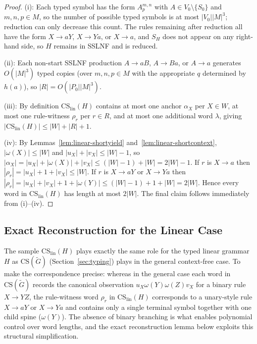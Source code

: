 \documentclass[11pt,a4paper]{article}
\newcommand{\CS}{\mathrm{CS}}
\newcommand{\lin}{\mathrm{lin}}
\begin{document}
\begin{proof}
\textup{(i)}:
Each typed symbol has the form $A_p^{m,n}$ with $A\in V_0\setminus\{S_0\}$ and
$m,n,p\in M$, so the number of possible typed symbols is at most $|V_0||M|^3$;
reduction can only decrease this count.
The rules remaining after reduction all have the form $X\to aY$, $X\to Ya$, or
$X\to a$, and $S_H$ does not appear on any right-hand side, so $H$ remains in SSLNF
and is reduced.

\textup{(ii)}:
Each non-start SSLNF production $A\to aB$, $A\to Ba$, or $A\to a$ generates
$O(|M|^3)$ typed copies (over $m,n,p\in M$ with the appropriate $q$ determined by
$h(a)$), so $|R|=O(|P_0||M|^3)$.

\textup{(iii)}:
By definition $\CS_{\lin}(H)$ contains at most one anchor $\alpha_X$ per $X\in W$,
at most one rule-witness $\rho_r$ per $r\in R$, and at most one additional word
$\lambda$, giving $|\CS_{\lin}(H)|\le|W|+|R|+1$.

\textup{(iv)}:
By Lemmas~\ref{lem:linear-shortyield} and~\ref{lem:linear-shortcontext},
$|\omega(X)|\le|W|$ and $|u_X|+|v_X|\le|W|-1$, so
$|\alpha_X|=|u_X|+|\omega(X)|+|v_X|\le(|W|-1)+|W|=2|W|-1$.
If $r$ is $X\to a$ then $|\rho_r|=|u_X|+1+|v_X|\le|W|$.
If $r$ is $X\to aY$ or $X\to Ya$ then
$|\rho_r|=|u_X|+|v_X|+1+|\omega(Y)|\le(|W|-1)+1+|W|=2|W|$.
Hence every word in $\CS_{\lin}(H)$ has length at most $2|W|$.
The final claim follows immediately from \textup{(i)}--\textup{(iv)}.
\end{proof}

\subsection{Exact Reconstruction for the Linear Case}
\label{subsec:linear-recon}

The sample $\CS_{\lin}(H)$ plays exactly the same role for the typed linear grammar $H$
as $\CS(\widetilde G)$ (Section~\ref{sec:typing}) plays in the general context-free case.
To make the correspondence precise:
whereas in the general case each word in $\CS(\widetilde G)$ records the canonical
observation $u_X\omega(Y)\omega(Z)v_X$ for a binary rule $X\to YZ$,
the rule-witness word $\rho_r$ in $\CS_{\lin}(H)$ corresponds to a unary-style rule
$X\to aY$ or $X\to Ya$ and contains only a single terminal symbol together with one
child spine ($\omega(Y)$).
The absence of binary branching is what enables polynomial control over word lengths,
and the exact reconstruction lemma below exploits this structural simplification.
\end{document}
